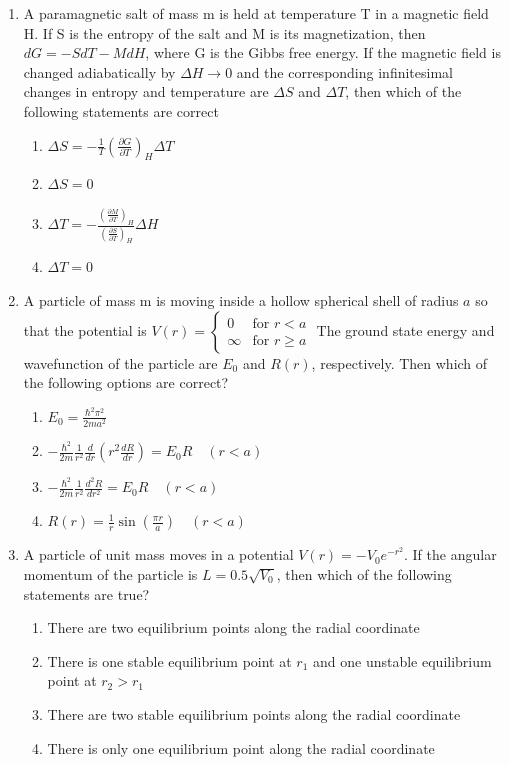 \documentclass[journal,12pt,onecolumn]{IEEEtran}
\theoremstyle{remark}
\begin{document}
\begin{enumerate}
\item
A paramagnetic salt of mass m is held at temperature T in a magnetic field H. If S is the entropy of the salt and M is its magnetization, then $dG = -SdT - MdH$, where G is the Gibbs free energy. If the magnetic field is changed adiabatically by $\Delta H \rightarrow 0$ and the corresponding infinitesimal changes in entropy and temperature are $\Delta S$ and $\Delta T$, then which of the following statements are correct
\begin{enumerate}
    \item $\Delta S = -\frac{1}{T} \left( \frac{\partial G}{\partial T} \right)_H \Delta T$
    \item $\Delta S = 0$
    \item $\Delta T = - \frac{\left( \frac{\partial M}{\partial T} \right)_H}{\left( \frac{\partial S}{\partial T} \right)_H} \Delta H$
    \item $\Delta T = 0$
\end{enumerate}


\item
A particle of mass m is moving inside a hollow spherical shell of radius $a$ so that the potential is
$V(r) = \begin{cases} 0 & \text{for } r < a \\ \infty & \text{for } r \ge a \end{cases}$
The ground state energy and wavefunction of the particle are $E_0$ and $R(r)$, respectively. Then which of the following options are correct?
\begin{enumerate}
    \item $E_0 = \frac{\hbar^2 \pi^2}{2ma^2}$
    \item $-\frac{\hbar^2}{2m} \frac{1}{r^2} \frac{d}{dr} \left( r^2 \frac{dR}{dr} \right) = E_0 R \quad (r < a)$
    \item $-\frac{\hbar^2}{2m} \frac{1}{r^2} \frac{d^2 R}{dr^2} = E_0 R \quad (r < a)$
    \item $R(r) = \frac{1}{r} \sin\left(\frac{\pi r}{a}\right) \quad (r < a)$
\end{enumerate}


\item
A particle of unit mass moves in a potential $V(r) = -V_0 e^{-r^2}$. If the angular momentum of the particle is $L = 0.5\sqrt{V_0}$, then which of the following statements are true?
\begin{enumerate}
    \item There are two equilibrium points along the radial coordinate
    \item There is one stable equilibrium point at $r_1$ and one unstable equilibrium point at $r_2 > r_1$
    \item There are two stable equilibrium points along the radial coordinate
    \item There is only one equilibrium point along the radial coordinate
\end{enumerate}



\end{enumerate}
\end{document}
